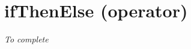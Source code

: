 
\section{ifThenElse (operator)}\label{ifthenelse:ifthenelseoperator}\hypertarget{ifthenelse:ifthenelseoperator}{}

\emph{To complete}



	
	
	

